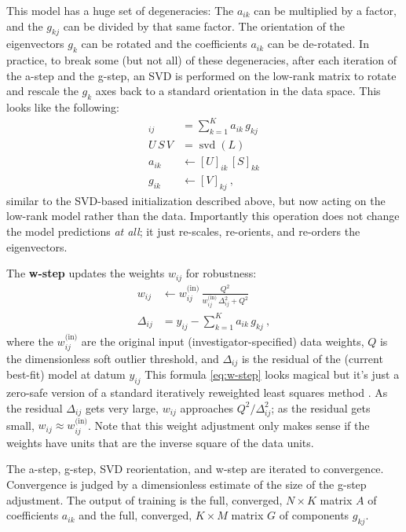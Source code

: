 \documentclass{article}
\DeclareMathOperator{\svd}{svd}
\begin{document}
This model has a huge set of degeneracies:
The $a_{ik}$ can be multiplied by a factor, and the $g_{kj}$ can be divided by that same factor.
The orientation of the eigenvectors $g_k$ can be rotated and the coefficients $a_{ik}$ can be de-rotated.
In practice, to break some (but not all) of these degeneracies, after each iteration of the a-step and the g-step,
an SVD is performed on the low-rank matrix
to rotate and rescale the $g_k$ axes back to a standard orientation in the data space.
This looks like the following:
\begin{align}
    [L]_{ij} &= \sum_{k=1}^K a_{ik}\,g_{kj} \\
    U\,S\,V &= \svd(L) \\
    a_{ik} &\leftarrow [U]_{ik}\,[S]_{kk} \\
    g_{ik} &\leftarrow [V]_{kj} ~,
\end{align}
similar to the SVD-based initialization described above, but now acting on the low-rank model rather than the data.
Importantly this operation does not change the model predictions \emph{at all}; it just re-scales, re-orients, and re-orders the eigenvectors.

The \textbf{w-step} updates the weights $w_{ij}$ for robustness:
\begin{align}
    w_{ij} &\leftarrow w^\text{(in)}_{ij}\,\frac{Q^2}{w^\text{(in)}_{ij}\,\Delta_{ij}^2 + Q^2} \label{eq:w-step} \\
    \Delta_{ij} &= y_{ij} - \sum_{k=1}^K a_{ik}\,g_{kj} ~,
\end{align}
where the $w^\text{(in)}_{ij}$ are the original input (investigator-specified) data weights,
$Q$ is the dimensionless soft outlier threshold,
and $\Delta_{ij}$ is the residual of the (current best-fit) model at datum $y_{ij}$
This formula \eqref{eq:w-step} looks magical but it's just a zero-safe version of a standard iteratively reweighted least squares method \cite{irls}.
As the residual $\Delta_{ij}$ gets very large, $w_{ij}$ approaches $Q^2 / \Delta_{ij}^2$;
as the residual gets small, $w_{ij}\approx w^\text{(in)}_{ij}$.
Note that this weight adjustment only makes sense if the weights have units that are the inverse square of the data units.

The a-step, g-step, SVD reorientation, and w-step are iterated to convergence.
Convergence is judged by a dimensionless estimate of the size of the g-step adjustment.
The output of training is the full, converged, $N\times K$ matrix $A$ of coefficients $a_{ik}$ and the full, converged, $K\times M$ matrix $G$ of components $g_{kj}$.
\end{document}
